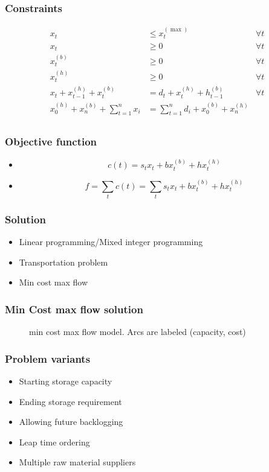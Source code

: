\documentclass{beamer}
\begin{document}
\begin{frame}
    \frametitle{Constraints}
    \begin{align*}
        x_t &\le x^{(\max)}_t & \forall t\\
        x_t &\ge 0 & \forall t\\
        x^{(b)}_t &\ge 0 & \forall t\\
        x^{(h)}_t &\ge 0 & \forall t\\
        x_t + x^{(h)}_{t - 1} + x^{(b)}_{t} &= d_t + x^{(h)}_t + h^{(b)}_{t - 1} & \forall t \\
        x^{(h)}_0 + x^{(b)}_n + \sum_{t=1}^n{x_i} &= \sum_{t=1}^n{d_i} + x^{(b)}_0 + x^{(h)}_n &\\
    \end{align*}
\end{frame}

\begin{frame}
    \frametitle{Objective function}
    \begin{itemize}
        \item \[c(t) = s_t x_t + b x^{(b)}_t + h x^{(h)}_t\]
        \item \[f =  \sum_t{c(t)} = \sum_t{ s_t x_t + b x^{(b)}_t + h x^{(h)}_t}\]
    \end{itemize}
\end{frame}

\begin{frame}
    \frametitle{Solution}
    \begin{itemize}
        \item Linear programming/Mixed integer programming
        \item Transportation problem
        \item \alert{Min cost max flow}
    \end{itemize}
\end{frame}

\begin{frame}[shrink=0.5]
    \frametitle{Min Cost max flow solution}
    \begin{figure}[h]
      \centering
      
      \caption{min cost max flow model. Arcs are labeled (capacity, cost)}
    \end{figure}
\end{frame}

\begin{frame}
    \frametitle{Problem variants}
    \begin{itemize}
        \item Starting storage capacity
        \item Ending storage requirement
        \item Allowing future backlogging
        \item Leap time ordering
        \item Multiple raw material suppliers
    \end{itemize}
\end{frame}
\end{document}
